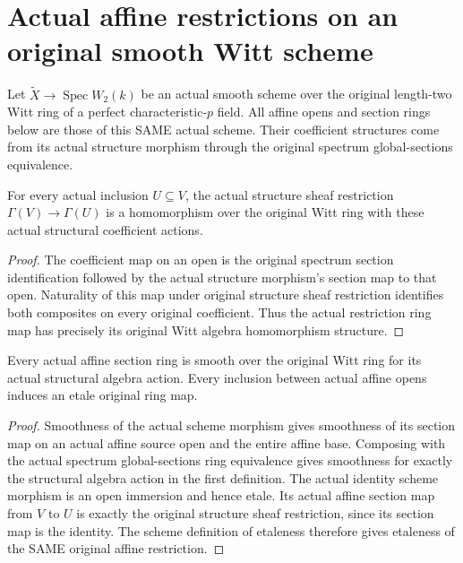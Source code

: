 \section{Actual affine restrictions on an original smooth Witt scheme}
\label{sec:witt-two-scheme-affine-restrictions}

Let $\widetilde X\to\operatorname{Spec}W_2(k)$ be an actual smooth
scheme over the original length-two Witt ring of a perfect
characteristic-$p$ field. All affine opens and section rings below
are those of this SAME actual scheme. Their coefficient structures
come from its actual structure morphism through the original
spectrum global-sections equivalence.

\begin{definition}
\label{def:witt-two-scheme-affine-section-restriction}
\leanok
For every actual inclusion $U\subseteq V$, the actual structure
sheaf restriction $\Gamma(V)\to\Gamma(U)$ is a homomorphism over
the original Witt ring with these actual structural coefficient
actions.
\end{definition}
\begin{proof}
The coefficient map on an open is the original spectrum
section identification followed by the actual structure
morphism's section map to that open. Naturality of this map
under original structure sheaf restriction identifies both
composites on every original coefficient. Thus the actual
restriction ring map has precisely its original Witt algebra
homomorphism structure.
\end{proof}

\begin{theorem}
\label{thm:witt-two-smooth-affine-sections-and-etale-restriction}
\leanok
Every actual affine section ring is smooth over the original Witt
ring for its actual structural algebra action. Every inclusion
between actual affine opens induces an etale original ring map.
\end{theorem}
\begin{proof}
Smoothness of the actual scheme morphism gives smoothness of its
section map on an actual affine source open and the entire affine
base. Composing with the actual spectrum global-sections ring
equivalence gives smoothness for exactly the structural algebra
action in the first definition. The actual identity scheme
morphism is an open immersion and hence etale. Its actual affine
section map from $V$ to $U$ is exactly the original structure
sheaf restriction, since its section map is the identity. The
scheme definition of etaleness therefore gives etaleness of the
SAME original affine restriction.
\end{proof}

